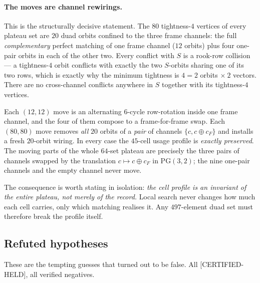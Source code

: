 \documentclass[10pt,a4paper]{article}
\newcommand{\CH}{\textsf{[CERTIFIED-HELD]}}
\begin{document}
\paragraph{The moves are channel rewirings.} This is the structurally decisive statement. The $80$
tightness-$4$ vertices of every plateau set are $20$ duad orbits confined to the three frame
channels: the full \emph{complementary} perfect matching of one frame channel ($12$ orbits) plus
four one-pair orbits in each of the other two. Every conflict with $S$ is a rook-row collision --- a
tightness-$4$ orbit conflicts with exactly the two $S$-orbits sharing one of its two rows, which is
exactly why the minimum tightness is $4 = 2$ orbits $\times\ 2$ vectors. There are no cross-channel
conflicts anywhere in $S$ together with its tightness-$4$ vertices.

Each $(12,12)$ move is an alternating $6$-cycle row-rotation inside one frame channel, and the four
of them compose to a frame-for-frame swap. Each $(80,80)$ move removes \emph{all} $20$ orbits of a
\emph{pair} of channels $\{c, c \oplus c_{F}\}$ and installs a fresh $20$-orbit wiring. In every
case the $45$-cell usage profile is \emph{exactly preserved}. The moving parts of the whole
$64$-set plateau are precisely the three pairs of channels swapped by the translation
$c \mapsto c \oplus c_{F}$ in $\mathrm{PG}(3,2)$; the nine one-pair channels and the empty channel
never move.

The consequence is worth stating in isolation: \emph{the cell profile is an invariant of the entire
plateau, not merely of the record.} Local search never changes how much each cell carries, only
which matching realises it. Any $497$-element duad set must therefore break the profile itself.

\subsection{Refuted hypotheses}

These are the tempting guesses that turned out to be false. All \CH{}, all verified negatives.
\end{document}
